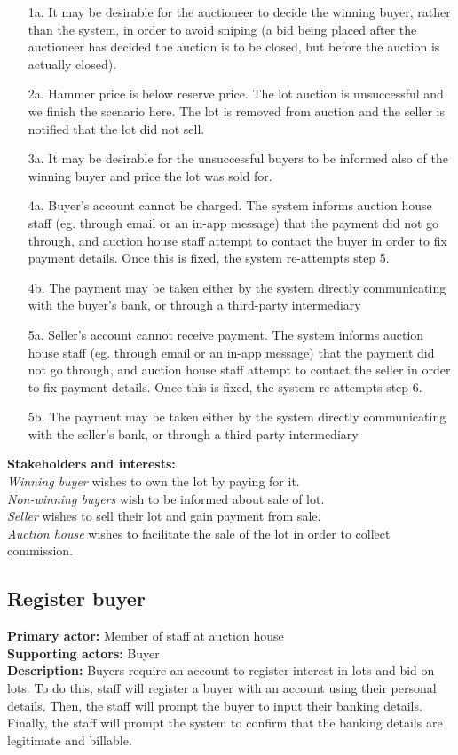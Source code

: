 \documentclass[titlepage, 12pt]{extarticle}
\begin{document}
\begin{itemize}
\item [1a.] It may be desirable for the auctioneer to decide the winning buyer, rather than the system, in order to avoid sniping (a bid being placed after the auctioneer has decided the auction is to be closed, but before the auction is actually closed). 
\item [2a.] Hammer price is below reserve price. The lot auction is unsuccessful and we finish the scenario here. The lot is removed from auction and the seller is notified that the lot did not sell.
\item [3a.] It may be desirable for the unsuccessful buyers to be informed also of the winning buyer and price the lot was sold for. 
\item [4a.] Buyer's account cannot be charged.  The system informs auction house staff (eg. through email or an in-app message) that the payment did not go through, and auction house staff attempt to contact the buyer in order to fix payment details. Once this is fixed, the system re-attempts step 5.
\item [4b.] The payment may be taken either by the system directly communicating with the buyer's bank, or through a third-party intermediary
\item [5a.] Seller's account cannot receive payment. The system informs auction house staff (eg. through email or an in-app message) that the payment did not go through, and auction house staff attempt to contact the seller in order to fix payment details. Once this is fixed, the system re-attempts step 6.
\item [5b.] The payment may be taken either by the system directly communicating with the seller's bank, or through a third-party intermediary
\end{itemize}
{\bf Stakeholders and interests: }
\\{\em Winning buyer} wishes to own the lot by paying for it.
\\{\em Non-winning buyers} wish to be informed about sale of lot.
\\{\em Seller} wishes to sell their lot and gain payment from sale.
\\{\em Auction house} wishes to facilitate the sale of the lot in order to collect commission.
\subsection{Register buyer}
{\bf Primary actor: } Member of staff at auction house
\\{\bf Supporting actors: } Buyer
\\{\bf Description: } Buyers require an account to register interest in lots and bid on lots. To do this, staff will register a buyer with an account using their personal details. Then, the staff will prompt the buyer to input their banking details. Finally, the staff will prompt the system to confirm that the banking details are legitimate and billable.
\end{document}
